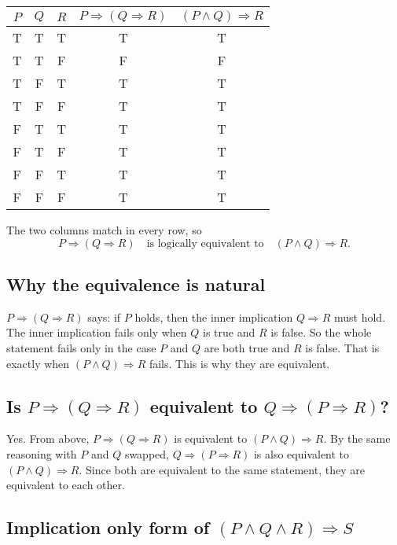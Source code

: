 \documentclass[11pt]{article}
\begin{document}
\begin{center}
\renewcommand{\arraystretch}{1.15}
\begin{tabular}{|c|c|c||c|c|}
\hline
$P$ & $Q$ & $R$ & $P \Rightarrow (Q \Rightarrow R)$ & $(P\land Q)\Rightarrow R$ \\
\hline
T & T & T & T & T \\
T & T & F & F & F \\
T & F & T & T & T \\
T & F & F & T & T \\
F & T & T & T & T \\
F & T & F & T & T \\
F & F & T & T & T \\
F & F & F & T & T \\
\hline
\end{tabular}
\end{center}

The two columns match in every row, so
\[
P \Rightarrow (Q \Rightarrow R) \quad\text{is logically equivalent to}\quad (P \land Q) \Rightarrow R.
\]

\subsection*{Why the equivalence is natural}

$P \Rightarrow (Q \Rightarrow R)$ says: if $P$ holds, then the inner implication $Q \Rightarrow R$ must hold. The inner implication fails only when $Q$ is true and $R$ is false. So the whole statement fails only in the case $P$ and $Q$ are both true and $R$ is false. That is exactly when $(P \land Q) \Rightarrow R$ fails. This is why they are equivalent.

\subsection*{Is $P \Rightarrow (Q \Rightarrow R)$ equivalent to $Q \Rightarrow (P \Rightarrow R)$?}

Yes. From above, $P \Rightarrow (Q \Rightarrow R)$ is equivalent to $(P \land Q) \Rightarrow R$. By the same reasoning with $P$ and $Q$ swapped, $Q \Rightarrow (P \Rightarrow R)$ is also equivalent to $(P \land Q) \Rightarrow R$. Since both are equivalent to the same statement, they are equivalent to each other.

\subsection*{Implication only form of $(P \land Q \land R) \Rightarrow S$}
\end{document}
